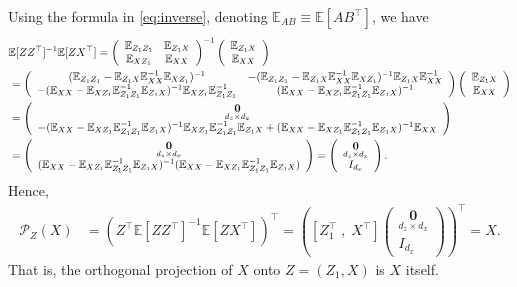 \documentclass[10.5pt, A4paper, openany, uplatex]{book}
\newcommand{\mbf}{\mathbf}
\newcommand{\mcl}{\mathcal}
\newcommand{\E}{\mathbb{E}}
\numberwithin{equation}{section}
\begin{document}
Using the formula in \eqref{eq:inverse}, denoting $\E_{AB} \equiv \E[A B^\top] $, we have
\small\begin{align}\label{eq:ZX}
\begin{split}
\E[ZZ^\top]^{-1}\E[ZX^\top] 
	& = \left(\begin{array}{cc}
		\E_{Z_1 Z_1} & \E_{Z_1 X} \\
		\E_{X Z_1} & \E_{X X} 
		\end{array}	\right)^{-1}
	\left( \begin{array}{c}
		\E_{Z_1 X} \\
		\E_{X X} 
	\end{array}	\right) \\
	& \hspace{-80pt}= \left(\begin{array}{cc}
		(\E_{Z_1 Z_1}  - \E_{Z_1 X} \E_{X X} ^{-1}\E_{X Z_1} )^{-1} & -(\E_{Z_1 Z_1}  - \E_{Z_1 X} \E_{X X}^{-1} \E_{X Z_1} )^{-1} \E_{Z_1 X} \E_{X X}^{-1} \\
		-(\E_{X X}  - \E_{X Z_1} \E_{Z_1 Z_1}^{-1} \E_{Z_1 X} )^{-1} \E_{X Z_1} \E_{Z_1 Z_1}^{-1}  & (\E_{X X} - \E_{X Z_1} \E_{Z_1 Z_1}^{-1} \E_{Z_1 X} )^{-1}
	\end{array} \right)
	\left( \begin{array}{c}
		\E_{Z_1 X} \\
		\E_{X X} 
	\end{array}	\right)\\
	& \hspace{-80pt}= 
	\left(\begin{array}{c}
	\underset{d_z \times d_x}{\mbf{0}} \\
	-(\E_{X X}  - \E_{X Z_1} \E_{Z_1 Z_1}^{-1} \E_{Z_1 X} )^{-1} \E_{X Z_1} \E_{Z_1 Z_1}^{-1} \E_{Z_1 X} + (\E_{X X} - \E_{X Z_1} \E_{Z_1 Z_1}^{-1} \E_{Z_1 X} )^{-1} \E_{XX}
	\end{array} \right) \\
	& \hspace{-80pt}= 
	\left(\begin{array}{c}
	\underset{d_z \times d_x}{\mbf{0}} \\
	(\E_{X X}  - \E_{X Z_1} \E_{Z_1 Z_1}^{-1} \E_{Z_1 X} )^{-1} (\E_{X X} - \E_{X Z_1} \E_{Z_1 Z_1}^{-1} \E_{Z_1 X} )
	\end{array} \right)
	= 
	\left(\begin{array}{c}
	\underset{d_z \times d_x}{\mbf{0}} \\
	I_{d_x}
	\end{array} \right).
\end{split}
\end{align}\normalsize
Hence,
\begin{align*}
	\mcl{P}_Z(X)
	& = \left( Z^\top \E[ZZ^\top]^{-1} \E[ZX^\top] \right)^\top  = \left( \left[ Z^\top_1 \; , \; X^\top \right] \left(\begin{array}{c}
	\underset{d_z \times d_x}{\mbf{0}} \\
	I_{d_x}
	\end{array} \right) \right)^\top = X.
\end{align*}
That is, the orthogonal projection of $X$ onto $Z = (Z_1, X)$ is $X$ itself.
\end{document}
